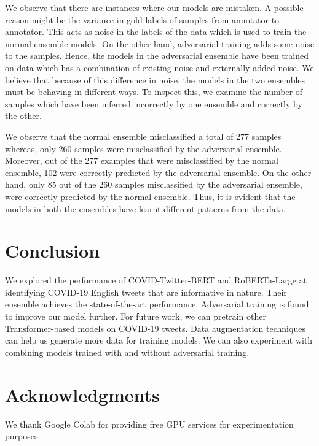 \documentclass[11pt,a4paper]{article}
\begin{document}
We observe that there are instances where our models are mistaken. A possible reason might be the variance in gold-labels of samples from annotator-to-annotator. This acts as noise in the labels of the data which is used to train the normal ensemble models. On the other hand, adversarial training adds some noise to the samples. Hence, the models in the adversarial ensemble have been trained on data which has a combination of existing noise and externally added noise. We believe that because of this difference in noise, the models in the two ensembles must be behaving in different ways. To inspect this, we examine the number of samples which have been inferred incorrectly by one ensemble and correctly by the other.


We observe that the normal ensemble misclassified a total of 277 samples whereas, only 260 samples were misclassified by the adversarial ensemble. Moreover, out of the 277 examples that were misclassified by the normal ensemble, 102 were correctly predicted by the adversarial ensemble. On the other hand, only 85 out of the 260 samples misclassified by the adversarial ensemble, were correctly predicted by the normal ensemble. Thus, it is evident that the models in both the ensembles have learnt different patterns from the data. 







\section{Conclusion}
\label{sec:end}

We explored the performance of COVID-Twitter-BERT and RoBERTa-Large at identifying COVID-19 English tweets that are informative in nature. Their ensemble achieves the state-of-the-art performance. Adversarial training is found to improve our model further. For future work, we can pretrain other Transformer-based models on COVID-19 tweets. Data augmentation techniques can help us generate more data for training models.  We can also experiment with combining models trained with and without adversarial training. 

\section*{Acknowledgments}
We thank Google Colab for providing free GPU services for experimentation purposes.





\end{document}
